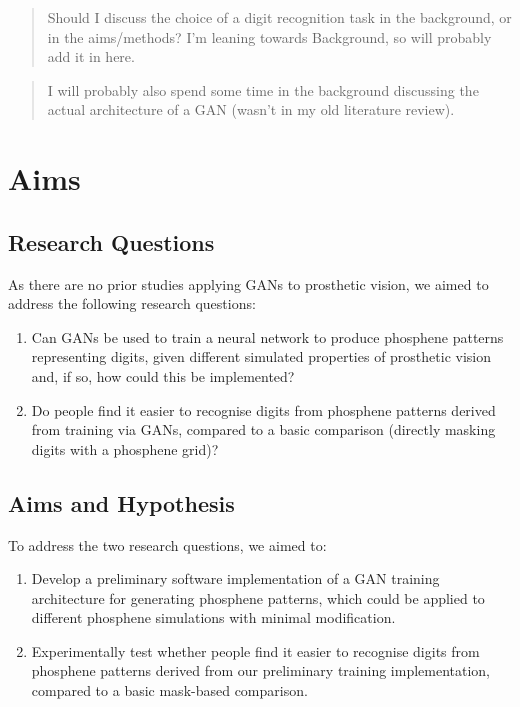 \documentclass[11pt]{article}
\begin{document}
\begin{quote}


\color{red}

Should I discuss the choice of a digit recognition task in the background, or in the aims/methods? I'm leaning towards Background, so will probably add it in here.
\end{quote}

\begin{quote}


\color{red}

I will probably also spend some time in the background discussing the actual architecture of a GAN (wasn't in my old literature review).
\end{quote}

\clearpage

\section{Aims}
\label{sec:org504c71e}

\subsection{Research Questions}
\label{sec:org26abd49}

As there are no prior studies applying GANs to prosthetic vision, we aimed to address the following research questions:

\begin{enumerate}
\item Can GANs be used to train a neural network to produce phosphene patterns representing digits, given different simulated properties of prosthetic vision and, if so, how could this be implemented?
\item Do people find it easier to recognise digits from phosphene patterns derived from training via GANs, compared to a basic comparison (directly masking digits with a phosphene grid)?
\end{enumerate}

\subsection{Aims and Hypothesis}
\label{sec:org5522edd}

To address the two research questions, we aimed to:

\begin{enumerate}
\item Develop a preliminary software implementation of a GAN training architecture for generating phosphene patterns, which could be applied to different phosphene simulations with minimal modification.
\item Experimentally test whether people find it easier to recognise digits from phosphene patterns derived from our preliminary training implementation, compared to a basic mask-based comparison.
\end{enumerate}
\end{document}
